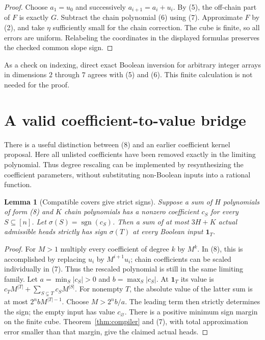 \documentclass[11pt]{article}
\newtheorem{lemma}[theorem]{Lemma}
\begin{document}
\begin{proof}
Choose $a_1=u_0$ and successively $a_{i+1}=a_i+u_i$.
By (5), the off-chain part of $F$ is exactly $G$. Subtract the
chain polynomial (6) using (7). Approximate $F$ by (2), and take
$\eta$ sufficiently small for the chain correction. The cube is
finite, so all errors are uniform. Relabeling the coordinates in
the displayed formulas preserves the checked common slope sign.
\end{proof}

As a check on indexing, direct exact Boolean inversion for arbitrary
integer arrays in dimensions $2$ through $7$ agrees with (5) and
(6). This finite calculation is not needed for the proof.

\section{A valid coefficient-to-value bridge}

There is a useful distinction between (8) and an earlier coefficient
kernel proposal. Here all unlisted coefficients have been removed
exactly in the limiting polynomial. Thus degree rescaling can be
implemented by resynthesizing the coefficient parameters, without
substituting non-Boolean inputs into a rational function.

\begin{lemma}[Compatible covers give strict signs]\label{lem:bridge}
Suppose a sum of $H$ polynomials of form (8) and $K$ chain
polynomials has a nonzero coefficient $c_S$ for every $S\subseteq[n]$.
Let $\sigma(S)=\operatorname{sgn}(c_S)$. Then a sum of at most
$3H+K$ actual admissible heads strictly has sign $\sigma(T)$ at
every Boolean input $\mathbf1_T$.
\end{lemma}

\begin{proof}
For $M>1$ multiply every coefficient of degree $k$ by $M^k$.
In (8), this is accomplished by replacing $u_i$ by $M^{i+1}u_i$;
chain coefficients can be scaled individually in (7). Thus the
rescaled polynomial is still in the same limiting family.
Let $a=\min_S|c_S|>0$ and $b=\max_S|c_S|$. At $\mathbf1_T$ its
value is $c_TM^{|T|}+\sum_{S\subsetneq T}c_SM^{|S|}$. For nonempty
$T$, the absolute value of the latter sum is at most
$2^n b M^{|T|-1}$. Choose $M>2^n b/a$. The leading term then
strictly determines the sign; the empty input has value $c_\varnothing$.
There is a positive minimum sign margin on the finite cube.
Theorem~\ref{thm:compiler} and (7), with total approximation error
smaller than that margin, give the claimed actual heads.
\end{proof}
\end{document}

